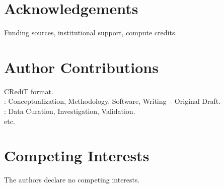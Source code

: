 \documentclass[11pt,a4paper]{article}
\newcommand{\placeholder}[1]{%
  \begin{tcolorbox}[colback=yellow!10,colframe=orange!60!black,
    fonttitle=\bfseries,title=Placeholder]
    #1
  \end{tcolorbox}%
}
\begin{document}
\section*{Acknowledgements}

\placeholder{Funding sources, institutional support, compute credits.}

\section*{Author Contributions}

\placeholder{%
  CRediT format.\\
  [Author A]: Conceptualization, Methodology, Software, Writing -- Original
  Draft.\\
  [Author B]: Data Curation, Investigation, Validation.\\
  etc.
}

\section*{Competing Interests}

The authors declare no competing interests.



\newpage

\end{document}
